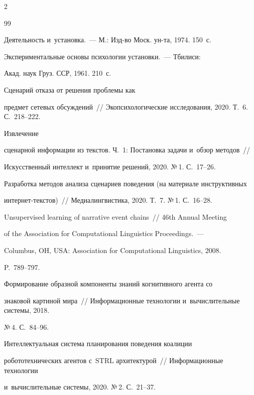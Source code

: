 \begin{multicols}{2}
{{\begin{thebibliography}{99}

   Деятельность и~установка.~--- М.: Изд-во Моск. ун-та, 1974. 150~с.


   Экспериментальные основы психологии установки.~--- Тбилиси: 

Акад. наук Груз. ССР, 1961. 210~с.


  Сценарий отказа от решения проблемы как 

предмет сетевых обсуждений~// Экопсихологические исследования, 2020. Т.~6. С.~218--222.


   Извлечение 

сценарной информации из текстов. Ч.~1: Постановка задачи и~обзор методов~// 

Искусственный интеллект и~принятие решений, 2020. №\,1. С.~17--26.



Разработка методов анализа сценариев поведения (на материале инструктивных  

ин\-тер\-нет-текс\-тов)~// Медиалингвистика, 2020. Т.~7. №\,1. С.~16--28.


   Unsupervised learning of narrative event chains~// 46th Annual Meeting 

  of the Association for Computational Linguistics Proceedings.~---

  Columbus, OH, USA: Association for Computational Linguistics, 2008.

   P.~789--797.


   Формирование образной компоненты знаний когнитивного агента со 

знаковой картиной мира~// Информационные технологии и~вычислительные системы, 2018. 

№\,4. С.~84--96.


   Интеллектуальная система планирования поведения коалиции 

робототехнических агентов с~STRL архитектурой~// Информационные технологии 

и~вычислительные системы, 2020. №\,2. С.~21--37.

\end{thebibliography}



 }

 }



\end{multicols}



